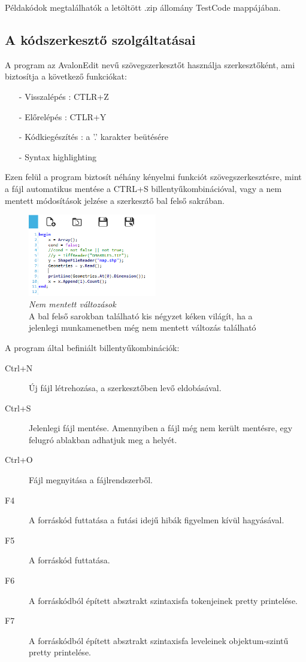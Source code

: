 \documentclass[a4paper,12pt]{report}
\begin{document}


Példakódok megtalálhatók a letöltött .zip állomány TestCode mappájában.

\subsection{A kódszerkesztő szolgáltatásai}
A program az AvalonEdit\cite{avalon} nevű szövegszerkesztőt használja szerkesztőként, ami biztosítja a következő funkciókat:
\begin{itemize}
\item[-] Visszalépés : CTLR+Z
\item[-] Előrelépés : CTLR+Y
\item[-] Kódkiegészítés : a '.' karakter beütésére
\item[-] Syntax highlighting
\end{itemize}

Ezen felül a program biztosít néhány kényelmi funkciót szövegszerkesztésre, mint a fájl automatikus mentése a CTRL+S billentyűkombinációval, vagy a nem mentett módosítások jelzése a szerkesztő bal felső sakrában.

\begin{figure}
  \caption{\textit{Nem mentett változások} \\ A bal felső sarokban található kis négyzet kéken világít, ha a jelenlegi munkamenetben még nem mentett változás található}
  \centering
    \includegraphics[width=0.5\textwidth]{images/filechanged.png}
\end{figure}

A program által befiniált billentyűkombinációk:
\begin{description}
\item[Ctrl+N] Új fájl létrehozása, a szerkesztőben levő eldobásával.
\item[Ctrl+S] Jelenlegi fájl mentése. Amennyiben a fájl még nem került mentésre, egy felugró ablakban adhatjuk meg a helyét.
\item[Ctrl+O] Fájl megnyitása a fájlrendszerből.
\item[F4] A forráskód futtatása a futási idejű hibák figyelmen kívül hagyásával.
\item[F5] A forráskód futtatása.
\item[F6] A forráskódból épített absztrakt szintaxisfa tokenjeinek pretty printelése.
\item[F7] A forráskódból épített absztrakt szintaxisfa leveleinek objektum-szintű pretty printelése.
\end{description}
\end{document}
